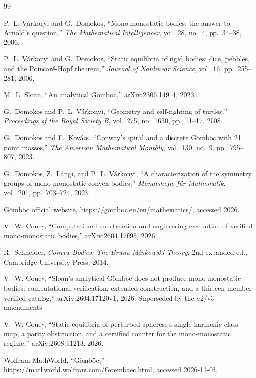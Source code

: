 \documentclass[11pt,a4paper]{article}
\begin{document}
\begin{thebibliography}{99}

P.~L. V\'arkonyi and G.~Domokos,
``Mono-monostatic bodies: the answer to Arnold's question,''
\textit{The Mathematical Intelligencer}, vol.~28, no.~4, pp.~34--38,
2006.

P.~L. V\'arkonyi and G.~Domokos,
``Static equilibria of rigid bodies: dice, pebbles, and the
Poincar\'e-Hopf theorem,''
\textit{Journal of Nonlinear Science}, vol.~16, pp.~255--281, 2006.

M.~L. Sloan,
``An analytical Gomboc,''
arXiv:2306.14914, 2023.

G.~Domokos and P.~L. V\'arkonyi,
``Geometry and self-righting of turtles,''
\textit{Proceedings of the Royal Society B}, vol.~275, no.~1630,
pp.~11--17, 2008.

G.~Domokos and F.~Kov\'acs,
``Conway's spiral and a discrete G\"omb\"oc with 21 point masses,''
\textit{The American Mathematical Monthly}, vol.~130, no.~9, pp.~795--807, 2023.

G.~Domokos, Z.~L\'angi, and P.~L. V\'arkonyi,
``A characterization of the symmetry groups of mono-monostatic
convex bodies,''
\textit{Monatshefte f\"ur Mathematik}, vol.~201, pp.~703--724, 2023.

G\"omb\"oc official website,
\url{https://gomboc.eu/en/mathematics/}, accessed 2026.

V.~W. Couey,
``Computational construction and engineering evaluation of verified
mono-monostatic bodies,''
arXiv:2604.17095, 2026.

R.~Schneider,
\textit{Convex Bodies: The Brunn-Minkowski Theory},
2nd expanded ed.,
Cambridge University Press, 2014.

V.~W. Couey,
``Sloan's analytical G\"omb\"oc does not produce mono-monostatic
bodies: computational verification, extended construction, and a
thirteen-member verified catalog,''
arXiv:2604.17120v1, 2026. Superseded by the v2/v3 amendments.

V.~W. Couey,
``Static equilibria of perturbed spheres: a single-harmonic class map,
a parity obstruction, and a certified counter for the mono-monostatic
regime,''
arXiv:2608.11213, 2026.

Wolfram MathWorld, ``G\"omb\"oc,''
\url{https://mathworld.wolfram.com/Goemboec.html}, accessed 2026-11-03.

\end{thebibliography}
\end{document}
